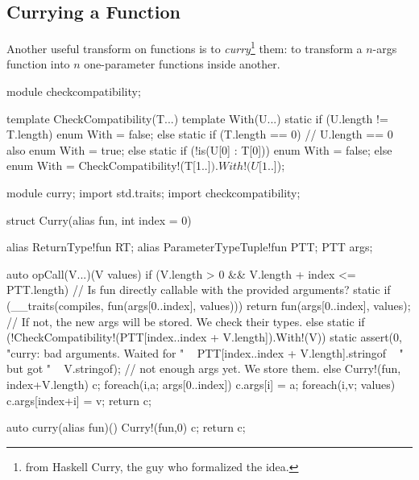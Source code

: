 \subsection{Currying a Function} \label{currying}


Another useful transform on functions is to \emph{curry}\footnote{from Haskell Curry, the guy who formalized the idea.} them: to transform a $n$-args function into $n$ one-parameter functions inside another.


\begin{dcode}
module checkcompatibility;

template CheckCompatibility(T...)
{
    template With(U...)
    {
        static if (U.length != T.length)
            enum With = false;
        else static if  (T.length == 0) // U.length == 0 also
            enum With = true;
        else static if (!is(U[0] : T[0]))
            enum With = false;
        else
            enum With = CheckCompatibility!(T[1..$]).With!(U[1..$]);
    }
}
\end{dcode}

\begin{dcode}
module curry;
import std.traits;
import checkcompatibility;

struct Curry(alias fun, int index = 0)
{
    alias ReturnType!fun RT;
    alias ParameterTypeTuple!fun PTT;
    PTT args;

    auto opCall(V...)(V values)
        if (V.length > 0
         && V.length + index <= PTT.length)
    {
        // Is fun directly callable with the provided arguments?
        static if (__traits(compiles, fun(args[0..index], values)))
            return fun(args[0..index], values);
        // If not, the new args will be stored. We check their types.
        else static if (!CheckCompatibility!(PTT[index..index + V.length]).With!(V))
            static assert(0, "curry: bad arguments. Waited for "
                            ~ PTT[index..index + V.length].stringof
                            ~ " but got " ~ V.stringof);
        // not enough args yet. We store them.
        else
        {
            Curry!(fun, index+V.length) c;
            foreach(i,a; args[0..index]) c.args[i] = a;
            foreach(i,v; values) c.args[index+i] = v;
            return c;
        }
    }
}

auto curry(alias fun)()
{
    Curry!(fun,0) c;
    return c;
}
\end{dcode}

